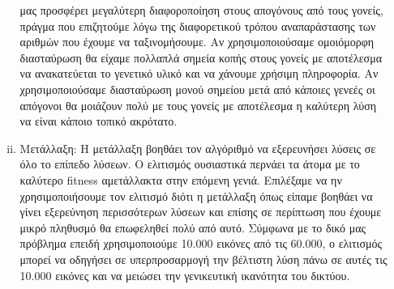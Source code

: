 \documentclass[12pt,a4paper]{article}
\newcommand{\tl}{\textlatin}
\begin{document}
\begin{enumerate}[a)]
\begin{enumerate}[i.]
                         μας προσφέρει μεγαλύτερη διαφοροποίηση στους απογόνους
                         από τους γονείς, πράγμα που επιζητούμε λόγω της
                         διαφορετικού τρόπου αναπαράστασης των αριθμών που
                         έχουμε να ταξινομήσουμε. Αν χρησιμοποιούσαμε ομοιόμορφη διασταύρωση θα είχαμε
                         πολλαπλά σημεία κοπής στους γονείς με αποτέλεσμα να
                         ανακατεύεται το γενετικό υλικό και να χάνουμε χρήσιμη
                         πληροφορία. Αν χρησιμοποιούσαμε διασταύρωση μονού
                         σημείου μετά από κάποιες γενεές οι απόγονοι θα μοιάζουν
                         πολύ με τους γονείς με αποτέλεσμα η καλύτερη λύση να
                         είναι κάποιο τοπικό ακρότατο.\\

                     \item  Μετάλλαξη: Η μετάλλαξη βοηθάει τον αλγόριθμό να
                         εξερευνήσει λύσεις σε όλο το επίπεδο λύσεων. Ο
                         ελιτισμός ουσιαστικά περνάει τα άτομα με το καλύτερο
                         \tl{fitness} αμετάλλακτα στην επόμενη γενιά. Επιλέξαμε
                         να ην χρησιμοποιήσουμε τον ελιτισμό διότι η μετάλλαξη
                         όπως είπαμε βοηθάει να γίνει εξερεύνηση περισσότερων
                         λύσεων και επίσης σε περίπτωση που έχουμε μικρό
                         πληθυσμό θα επωφεληθεί πολύ από αυτό. Σύμφωνα με το
                         δικό μας πρόβλημα επειδή χρησιμοποιούμε 10.000 εικόνες
                         από τις 60.000, ο ελιτισμός μπορεί να οδηγήσει σε
                         υπερπροσαρμογή την βέλτιστη λύση πάνω σε αυτές τις
                         10.000 εικόνες και να μειώσει την γενικευτική ικανότητα
                         του δικτύου.

                        
                    \end{enumerate}

            \end{enumerate}
\end{document}
